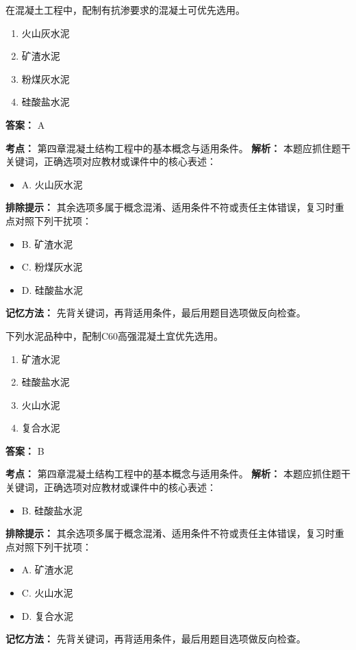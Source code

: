 \documentclass[UTF8,fontset=fandol,11pt]{ctexart}
\begin{document}
\begin{quizbox}[title={第 50 题}]
在混凝土工程中，配制有抗渗要求的混凝土可优先选用。\\
\begin{enumerate}[label=\Alph*.]
\item 火山灰水泥
\item 矿渣水泥
\item 粉煤灰水泥
\item 硅酸盐水泥
\end{enumerate}
\textbf{答案：} A
\vspace{0.25em}
\begin{answerbox}[title={考点解析}]
\textbf{考点：} 第四章混凝土结构工程中的基本概念与适用条件。
\textbf{解析：} 本题应抓住题干关键词，正确选项对应教材或课件中的核心表述：
\begin{itemize}
\item A. 火山灰水泥
\end{itemize}
\textbf{排除提示：} 其余选项多属于概念混淆、适用条件不符或责任主体错误，复习时重点对照下列干扰项：
\begin{itemize}
\item B. 矿渣水泥
\item C. 粉煤灰水泥
\item D. 硅酸盐水泥
\end{itemize}
\textbf{记忆方法：} 先背关键词，再背适用条件，最后用题目选项做反向检查。
\end{answerbox}
\end{quizbox}

\begin{quizbox}[title={第 51 题}]
下列水泥品种中，配制C60高强混凝土宜优先选用。\\
\begin{enumerate}[label=\Alph*.]
\item 矿渣水泥
\item 硅酸盐水泥
\item 火山水泥
\item 复合水泥
\end{enumerate}
\textbf{答案：} B
\vspace{0.25em}
\begin{answerbox}[title={考点解析}]
\textbf{考点：} 第四章混凝土结构工程中的基本概念与适用条件。
\textbf{解析：} 本题应抓住题干关键词，正确选项对应教材或课件中的核心表述：
\begin{itemize}
\item B. 硅酸盐水泥
\end{itemize}
\textbf{排除提示：} 其余选项多属于概念混淆、适用条件不符或责任主体错误，复习时重点对照下列干扰项：
\begin{itemize}
\item A. 矿渣水泥
\item C. 火山水泥
\item D. 复合水泥
\end{itemize}
\textbf{记忆方法：} 先背关键词，再背适用条件，最后用题目选项做反向检查。
\end{answerbox}
\end{quizbox}
\end{document}
